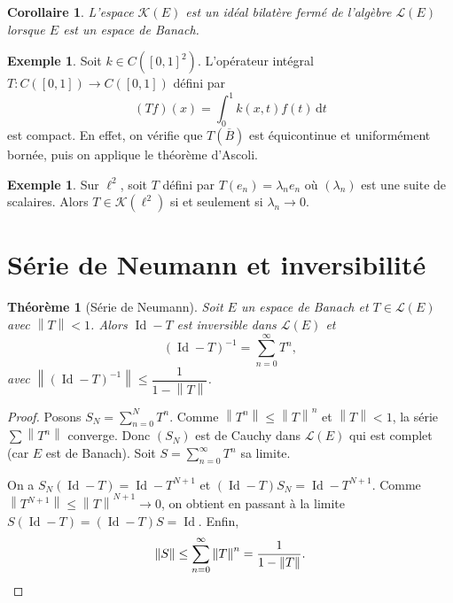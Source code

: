 \documentclass[a4paper,12pt]{book}
\DeclareMathOperator{\Id}{Id}
\newcommand{\dd}{\mathrm{d}}
\newcommand{\norm}[1]{\left\| #1 \right\|}
\theoremstyle{definition}
\newtheorem{exemple}[definition]{Exemple}
\theoremstyle{plain}
\newtheorem{theoreme}[definition]{Théorème}
\newtheorem{corollaire}[definition]{Corollaire}
\theoremstyle{remark}
\begin{document}
\begin{corollaire}\label{cor:compact-ideal}
L'espace $\mathcal{K}(E)$ est un idéal bilatère fermé de l'algèbre $\mathcal{L}(E)$
lorsque $E$ est un espace de Banach.
\end{corollaire}

\begin{exemple}\label{ex:operateur-integral-compact}
Soit $k \in C([0,1]^2)$. L'opérateur intégral $T : C([0,1]) \to C([0,1])$ défini par
\[
    (Tf)(x) = \int_0^1 k(x,t) f(t) \, \dd t
\]
est compact. En effet, on vérifie que $T(\overline{B})$ est équicontinue et uniformément
bornée, puis on applique le théorème d'Ascoli.
\end{exemple}

\begin{exemple}\label{ex:compact-hilbert}
Sur $\ell^2$, soit $T$ défini par $T(e_n) = \lambda_n e_n$ où $(\lambda_n)$ est une
suite de scalaires. Alors $T \in \mathcal{K}(\ell^2)$ si et seulement si
$\lambda_n \to 0$.
\end{exemple}

\section{Série de Neumann et inversibilité}
\label{sec:neumann}


\begin{theoreme}[Série de Neumann]\label{thm:neumann}
Soit $E$ un espace de Banach et $T \in \mathcal{L}(E)$ avec $\norm{T} < 1$. Alors
$\Id - T$ est inversible dans $\mathcal{L}(E)$ et
\[
    (\Id - T)^{-1} = \sum_{n=0}^{\infty} T^n,
\]
avec $\norm{(\Id - T)^{-1}} \leq \dfrac{1}{1 - \norm{T}}$.
\end{theoreme}

\begin{proof}
Posons $S_N = \sum_{n=0}^{N} T^n$. Comme $\norm{T^n} \leq \norm{T}^n$ et
$\norm{T} < 1$, la série $\sum \norm{T^n}$ converge. Donc $(S_N)$ est de Cauchy dans
$\mathcal{L}(E)$ qui est complet (car $E$ est de Banach). Soit
$S = \sum_{n=0}^{\infty} T^n$ sa limite.

On a $S_N(\Id - T) = \Id - T^{N+1}$ et $(\Id - T)S_N = \Id - T^{N+1}$.
Comme $\norm{T^{N+1}} \leq \norm{T}^{N+1} \to 0$, on obtient en passant à la limite
$S(\Id - T) = (\Id - T)S = \Id$. Enfin,
\[
    \norm{S} \leq \sum_{n=0}^{\infty} \norm{T}^n = \frac{1}{1 - \norm{T}}.
    \qedhere
\]
\end{proof}
\end{document}

